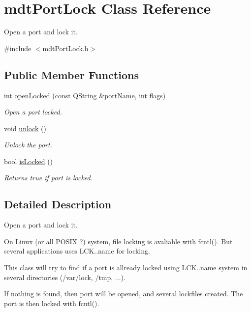 \hypertarget{classmdt_port_lock}{
\section{mdtPortLock Class Reference}
\label{classmdt_port_lock}
}


Open a port and lock it.  




{\ttfamily \#include $<$mdtPortLock.h$>$}

\subsection*{Public Member Functions}
\begin{DoxyCompactItemize}
\item 
int \hyperlink{classmdt_port_lock_a25e9a2cb8a10069fae75c76b6809c27f}{openLocked} (const QString \&portName, int flags)
\begin{DoxyCompactList}\small\item\em Open a port locked. \end{DoxyCompactList}\item 
void \hyperlink{classmdt_port_lock_a60b65f02d57568dc36c5e918aa5357a6}{unlock} ()
\begin{DoxyCompactList}\small\item\em Unlock the port. \end{DoxyCompactList}\item 
\hypertarget{classmdt_port_lock_a07a7d13509147d65dde89e95ac343eb2}{
bool \hyperlink{classmdt_port_lock_a07a7d13509147d65dde89e95ac343eb2}{isLocked} ()}
\label{classmdt_port_lock_a07a7d13509147d65dde89e95ac343eb2}

\begin{DoxyCompactList}\small\item\em Returns true if port is locked. \end{DoxyCompactList}\end{DoxyCompactItemize}


\subsection{Detailed Description}
Open a port and lock it. 

On Linux (or all POSIX ?) system, file locking is avaliable with fcntl(). But several applications uses LCK..name for locking.\par
 This class will try to find if a port is allready locked using LCK..name system in several directories (/var/lock, /tmp, ...).\par
 If nothing is found, then port will be opened, and several lockfiles created. The port is then locked with fcntl(). 

